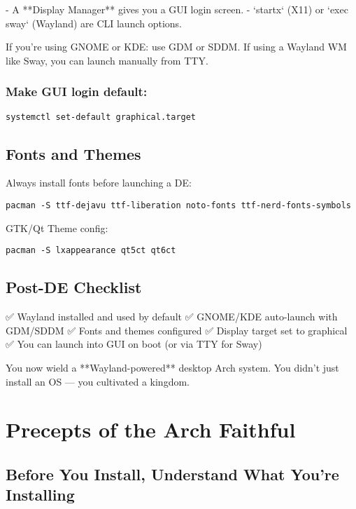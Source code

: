 \documentclass[12pt,openany]{book}
\begin{document}
- A **Display Manager** gives you a GUI login screen.
- `startx` (X11) or `exec sway` (Wayland) are CLI launch options.

If you're using GNOME or KDE: use GDM or SDDM.  
If using a Wayland WM like Sway, you can launch manually from TTY.

\subsection*{Make GUI login default:}

\begin{lstlisting}
systemctl set-default graphical.target
\end{lstlisting}

\section{Fonts and Themes}

Always install fonts before launching a DE:

\begin{lstlisting}
pacman -S ttf-dejavu ttf-liberation noto-fonts ttf-nerd-fonts-symbols
\end{lstlisting}

GTK/Qt Theme config:

\begin{lstlisting}
pacman -S lxappearance qt5ct qt6ct
\end{lstlisting}

\section{Post-DE Checklist}

✅ Wayland installed and used by default  
✅ GNOME/KDE auto-launch with GDM/SDDM  
✅ Fonts and themes configured  
✅ Display target set to graphical  
✅ You can launch into GUI on boot (or via TTY for Sway)

You now wield a **Wayland-powered** desktop Arch system. You didn’t just install an OS — you cultivated a kingdom.

\clearpage

\chapter{Precepts of the Arch Faithful}

\section*{Before You Install, Understand What You're Installing}
\end{document}
